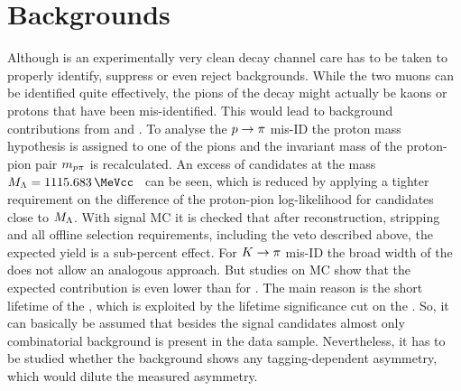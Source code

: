 
\section{Backgrounds}
\label{sec:bd2jpsiks:backgrounds}

Although \BdToJPsiKS is an experimentally very clean decay channel care has to
be taken to properly identify, suppress or even reject backgrounds. While the
two muons can be identified quite effectively, the pions of the \KS decay might
actually be kaons or protons that have been mis-identified. This would lead
to background contributions from \BdToJPsiKst and \LbToJPsiL. To analyse the
${p} \rightarrow {\ensuremath{\pi}}$ mis-ID the proton mass hypothesis is assigned to one of
the pions and the invariant mass of the proton-pion pair $m_{{p}{\pi}}$ is
recalculated. An excess of candidates at the \Lz mass $M_{\Lz} =
\SI{1115.683}{\MeVcc}$~\cite{PDG2014} can be seen, which is reduced by applying
a tighter requirement on the difference of the proton-pion log-likelihood for
candidates close to $M_{{\Lambda}}$. With \LbToJPsiL signal MC it is checked that
after reconstruction, stripping and all offline selection requirements,
including the veto described above, the expected yield is a sub-percent
effect. For ${K} \rightarrow {\ensuremath{\pi}}$ mis-ID the broad width of the \Kstarz does not
allow an analogous approach. But studies on \BdToJPsiKst MC show that the
expected contribution is even lower than for \LbToJPsiL. The main reason is
the short lifetime of the \Kstarz, which is exploited by the lifetime
significance cut on the \KS. So, it can basically be assumed that besides the
signal candidates almost only combinatorial background is present in the data
sample. Nevertheless, it has to be studied whether the background shows any
tagging-dependent asymmetry, which would dilute the measured \CP asymmetry.

